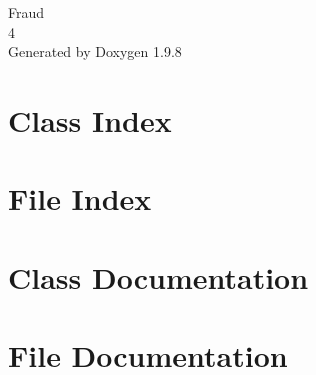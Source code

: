 \documentclass[twoside]{book}
\newcommand{\+}{\discretionary{\mbox{\scriptsize$\hookleftarrow$}}{}{}}
\newcommand{\clearemptydoublepage}{%
    \newpage{\pagestyle{empty}\cleardoublepage}%
  }
\begin{document}
  \raggedbottom
    \hypersetup{pageanchor=false,
                bookmarksnumbered=true,
                pdfencoding=unicode
               }
  \begin{titlepage}
  \vspace*{7cm}
  \begin{center}%
  {\Large Fraud}\\
  [1ex]\large 4 \\
  \vspace*{1cm}
  {\large Generated by Doxygen 1.9.8}\\
  \end{center}
  \end{titlepage}
  \clearemptydoublepage
  \tableofcontents
  \clearemptydoublepage
  \hypersetup{pageanchor=true}
\chapter{Class Index}

\chapter{File Index}

\chapter{Class Documentation}





\chapter{File Documentation}


















  \backmatter
  \newpage
  \clearemptydoublepage
  \printindex
\end{document}
